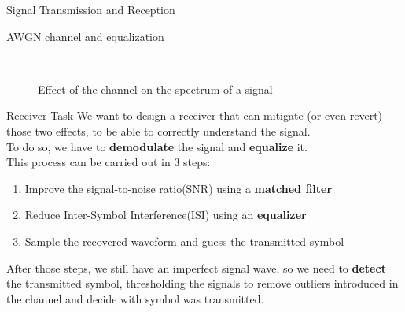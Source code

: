 \begin{section}{Signal Transmission and Reception}
\begin{subsection}{AWGN channel and equalization}
\begin{figure}[h]
      \
      \centering
      \hfill
      \caption{Effect of the channel on the spectrum of a signal}
      \label{fig:channel effect on the spectrum}
    \end{figure}
    \begin{subsubsection}{Receiver Task}
      We want to design a receiver that can mitigate (or even revert) those two effects, to be 
      able to correctly understand the signal.\\
      To do so, we have to \textbf{demodulate} the signal and \textbf{equalize} it.\\
      This process can be carried out in 3 steps:
      \begin{enumerate}
        \item Improve the signal-to-noise ratio(SNR) using a \textbf{matched filter}
        \item Reduce Inter-Symbol Interference(ISI) using an \textbf{equalizer}
        \item Sample the recovered waveform and guess the transmitted symbol
      \end{enumerate}
      After those steps, we still have an imperfect signal wave, so we need to \textbf{detect} the
      transmitted symbol, thresholding the signals to remove outliers introduced in the channel 
      and decide with symbol was transmitted.\\

\end{subsubsection}
\end{subsection}
\end{section}
